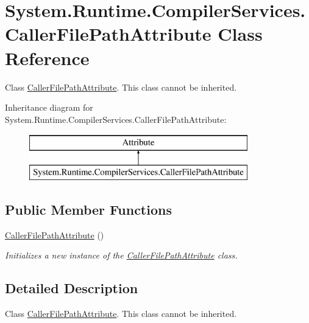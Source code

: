 \hypertarget{class_system_1_1_runtime_1_1_compiler_services_1_1_caller_file_path_attribute}{}\section{System.\+Runtime.\+Compiler\+Services.\+Caller\+File\+Path\+Attribute Class Reference}
\label{class_system_1_1_runtime_1_1_compiler_services_1_1_caller_file_path_attribute}


Class \hyperlink{class_system_1_1_runtime_1_1_compiler_services_1_1_caller_file_path_attribute}{Caller\+File\+Path\+Attribute}. This class cannot be inherited.  


Inheritance diagram for System.\+Runtime.\+Compiler\+Services.\+Caller\+File\+Path\+Attribute\+:\begin{figure}[H]
\begin{center}
\leavevmode
\includegraphics[height=2.000000cm]{class_system_1_1_runtime_1_1_compiler_services_1_1_caller_file_path_attribute}
\end{center}
\end{figure}
\subsection*{Public Member Functions}
\begin{DoxyCompactItemize}
\item 
\hyperlink{class_system_1_1_runtime_1_1_compiler_services_1_1_caller_file_path_attribute_ad2723ac88d5738b2770451462ef455a7}{Caller\+File\+Path\+Attribute} ()
\begin{DoxyCompactList}\small\item\em Initializes a new instance of the \hyperlink{class_system_1_1_runtime_1_1_compiler_services_1_1_caller_file_path_attribute}{Caller\+File\+Path\+Attribute} class. \end{DoxyCompactList}\end{DoxyCompactItemize}


\subsection{Detailed Description}
Class \hyperlink{class_system_1_1_runtime_1_1_compiler_services_1_1_caller_file_path_attribute}{Caller\+File\+Path\+Attribute}. This class cannot be inherited. 

